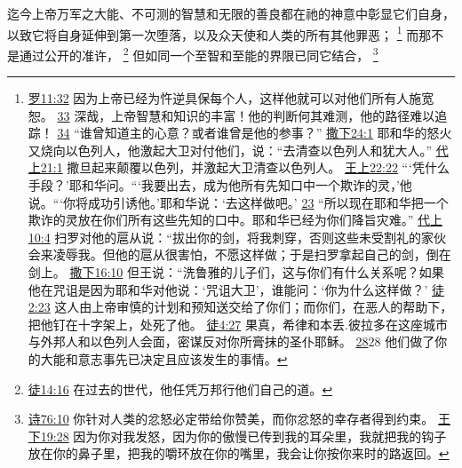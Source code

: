 \documentclass[12pt, a4paper, oneside]{ctexart}
\newcounter{parnum}[section]
\newcommand{\N}{%
   \noindent\refstepcounter{parnum}%
    \makebox[\parindent][l]{\textbf{\arabic{parnum}.}}}
\begin{document}
\N 迄今上帝万军之大能、不可测的智慧和无限的善良都在祂的神意中彰显它们自身，以致它将自身延伸到第一次堕落，以及众天使和人类的所有其他罪恶；
	\footnote {
		\href{https://biblehub.com/romans/11-32.htm}{罗11:32} 因为上帝已经为忤逆具保每个人，这样他就可以对他们所有人施宽恕。
		\href{https://biblehub.com/romans/11-33.htm}{33} 深哉，上帝智慧和知识的丰富！他的判断何其难测，他的路径难以追踪！
		\href{https://biblehub.com/romans/11-34.htm}{34} “谁曾知道主的心意？或者谁曾是他的参事？”
		\href{https://biblehub.com/2_samuel/24-1.htm}{撒下24:1} 耶和华的怒火又烧向以色列人，他激起大卫对付他们，说：“去清查以色列人和犹大人。”
		\href{https://biblehub.com/1_chronicles/21-1.htm}{代上21:1} 撒旦起来颠覆以色列，并激起大卫清查以色列人。
		\href{https://biblehub.com/1_kings/22-22.htm}{王上22:22} “‘凭什么手段？’耶和华问。“‘我要出去，成为他所有先知口中一个欺诈的灵，’他说。“‘你将成功引诱他。’耶和华说：‘去这样做吧。’
		\href{https://biblehub.com/1_kings/22-23.htm}{23} “所以现在耶和华把一个欺诈的灵放在你们所有这些先知的口中。耶和华已经为你们降旨灾难。”
		\href{https://biblehub.com/1_chronicles/10-4.htm}{代上10:4} 扫罗对他的扈从说：“拔出你的剑，将我刺穿，否则这些未受割礼的家伙会来凌辱我。但他的扈从很害怕，不愿这样做；于是扫罗拿起自己的剑，倒在剑上。
		\href{https://biblehub.com/2_samuel/16-10.htm}{撒下16:10} 但王说：“洗鲁雅的儿子们，这与你们有什么关系呢？如果他在咒诅是因为耶和华对他说：‘咒诅大卫’，谁能问：‘你为什么这样做？’
		\href{https://biblehub.com/acts/2-23.htm}{徒2:23} 这人由上帝审慎的计划和预知送交给了你们；而你们，在恶人的帮助下，把他钉在十字架上，处死了他。
		\href{https://biblehub.com/acts/4-27.htm}{徒4:27} 果真，希律和本丢.彼拉多在这座城市与外邦人和以色列人会面，密谋反对你所膏抹的圣仆耶稣。
		\href{https://biblehub.com/acts/4-28.htm}{28}28 他们做了你的大能和意志事先已决定且应该发生的事情。
	}
	而那不是通过公开的准许，
	\footnote {
		\href{https://biblehub.com/acts/14-16.htm}{徒14:16} 在过去的世代，他任凭万邦行他们自己的道。
	}
	但如同一个至智和至能的界限已同它结合，
	\footnote {
		\href{https://biblehub.com/psalms/76-10.htm}{诗76:10} 你针对人类的忿怒必定带给你赞美，而你忿怒的幸存者得到约束。
		\href{https://biblehub.com/2_kings/19-28.htm}{王下19:28} 因为你对我发怒，因为你的傲慢已传到我的耳朵里，我就把我的钩子放在你的鼻子里，把我的嚼环放在你的嘴里，我会让你按你来时的路返回。
	}
\end{document}
